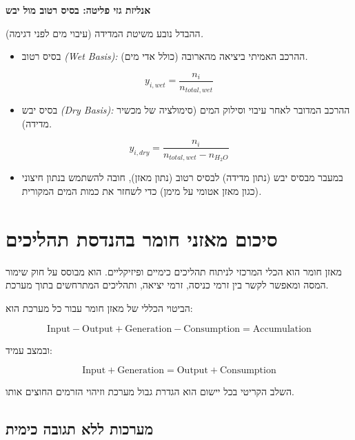 \documentclass[
  hebrew,
  letterpaper,
  DIV=11,
  numbers=noendperiod]{scrreprt}
\providecommand{\tightlist}{%
  \setlength{\itemsep}{0pt}\setlength{\parskip}{0pt}}
\begin{document}
\textbf{אנליזת גזי פליטה: בסיס רטוב מול יבש}

ההבדל נובע משיטת המדידה (עיבוי מים לפני דגימה)\emph{.}

\begin{itemize}
\tightlist
\item
  בסיס רטוב \emph{(Wet Basis):} ההרכב האמיתי ביציאה מהארובה (כולל אדי
  מים)\emph{.}
\end{itemize}

\[y_{i,wet} = \frac{n_{i}}{n_{total,wet}}\]

\begin{itemize}
\tightlist
\item
  בסיס יבש \emph{(Dry Basis):} ההרכב המדובר לאחר עיבוי וסילוק המים
  (סימולציה של מכשיר מדידה)\emph{.}
\end{itemize}

\[y_{i,dry} = \frac{n_{i}}{n_{total,wet} - n_{H_{2}O}}\]

\begin{itemize}
\tightlist
\item
  במעבר מבסיס יבש (נתון מדידה) לבסיס רטוב (נתון מאזן), חובה להשתמש בנתון
  חיצוני (כגון מאזן אטומי על מימן) כדי לשחזר את כמות המים
  המקורית\emph{.}
\end{itemize}

\section{סיכום מאזני חומר בהנדסת
תהליכים}\label{ux5e1ux5d9ux5dbux5d5ux5dd-ux5deux5d0ux5d6ux5e0ux5d9-ux5d7ux5d5ux5deux5e8-ux5d1ux5d4ux5e0ux5d3ux5e1ux5ea-ux5eaux5d4ux5dcux5d9ux5dbux5d9ux5dd}

מאזן חומר הוא הכלי המרכזי לניתוח תהליכים כימיים ופיזיקליים. הוא מבוסס על
חוק שימור המסה ומאפשר לקשר בין זרמי כניסה, זרמי יציאה, ותהליכים המתרחשים
בתוך מערכת.

הביטוי הכללי של מאזן חומר עבור כל מערכת הוא:

\[
\text{Input} - \text{Output} + \text{Generation} - \text{Consumption} = \text{Accumulation}
\]

ובמצב עמיד:

\[
\text{Input} + \text{Generation} = \text{Output} + \text{Consumption}
\]

השלב הקריטי בכל יישום הוא הגדרת גבול מערכת וזיהוי הזרמים החוצים אותו.

\subsection{מערכות ללא תגובה
כימית}\label{ux5deux5e2ux5e8ux5dbux5d5ux5ea-ux5dcux5dcux5d0-ux5eaux5d2ux5d5ux5d1ux5d4-ux5dbux5d9ux5deux5d9ux5ea}
\end{document}
